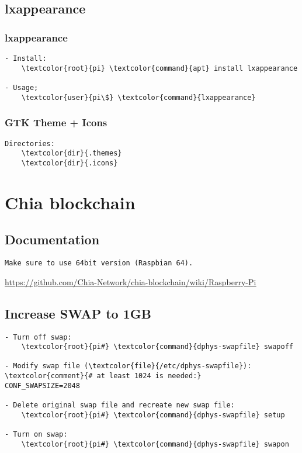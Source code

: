\documentclass[10pt, a4paper, onecolumn, openany]{book} %
\begin{document}
\section{lxappearance}
\subsection{lxappearance}
\begin{Verbatim}[commandchars=\\\{\}]
- Install:
    \textcolor{root}{pi} \textcolor{command}{apt} install lxappearance
    
- Usage;
    \textcolor{user}{pi\$} \textcolor{command}{lxappearance}
\end{Verbatim}
\subsection{GTK Theme + Icons}
\begin{Verbatim}[commandchars=\\\{\}]
Directories:
    \textcolor{dir}{.themes}
    \textcolor{dir}{.icons}
\end{Verbatim}


\chapter{Chia blockchain}
\section{Documentation}
\begin{Verbatim}[commandchars=\\\{\}]
Make sure to use 64bit version (Raspbian 64).
\end{Verbatim}
\underline{\url{https://github.com/Chia-Network/chia-blockchain/wiki/Raspberry-Pi}}

\section{Increase SWAP to 1GB}
\begin{Verbatim}[commandchars=\\\{\}]
- Turn off swap:
    \textcolor{root}{pi#} \textcolor{command}{dphys-swapfile} swapoff
    
- Modify swap file (\textcolor{file}{/etc/dphys-swapfile}):
\textcolor{comment}{# at least 1024 is needed:}
CONF_SWAPSIZE=2048

- Delete original swap file and recreate new swap file:
    \textcolor{root}{pi#} \textcolor{command}{dphys-swapfile} setup
     
- Turn on swap:
    \textcolor{root}{pi#} \textcolor{command}{dphys-swapfile} swapon
\end{Verbatim}
\end{document}
